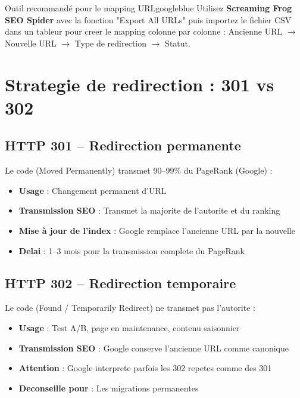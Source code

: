 \begin{mybox}{Outil recommandé pour le mapping URL}{googleblue}
Utilisez \textbf{Screaming Frog SEO Spider} avec la fonction "Export All URLs" puis importez le fichier CSV dans un tableur pour creer le mapping colonne par colonne : Ancienne URL $\rightarrow$ Nouvelle URL $\rightarrow$ Type de redirection $\rightarrow$ Statut.
\end{mybox}

\section{Strategie de redirection : 301 vs 302}

\subsection{HTTP 301 -- Redirection permanente}

Le code  (Moved Permanently) transmet 90--99\% du PageRank (Google) :

\begin{itemize}
    \item \textbf{Usage} : Changement permanent d'URL
    \item \textbf{Transmission SEO} : Transmet la majorite de l'autorite et du ranking
    \item \textbf{Mise à jour de l'index} : Google remplace l'ancienne URL par la nouvelle
    \item \textbf{Delai} : 1--3 mois pour la transmission complete du PageRank
\end{itemize}

\subsection{HTTP 302 -- Redirection temporaire}

Le code  (Found / Temporarily Redirect) ne transmet pas l'autorite :

\begin{itemize}
    \item \textbf{Usage} : Test A/B, page en maintenance, contenu saisonnier
    \item \textbf{Transmission SEO} : Google conserve l'ancienne URL comme canonique
    \item \textbf{Attention} : Google interprete parfois les 302 repetes comme des 301
    \item \textbf{Deconseille pour} : Les migrations permanentes
\end{itemize}

